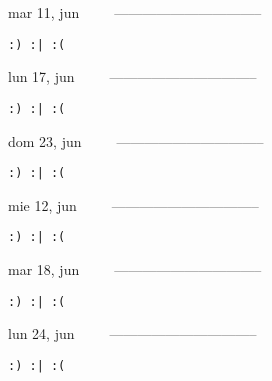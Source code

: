 \documentclass[letterpaper,10pt]{article}
\begin{document}
\begin{multicols}{3}
{mar 11, jun\ \ \ \ \ --------------------------------}
\begin{flushright}\begin{small}\texttt{:) :| :(}\end{small}\end{flushright}
\vfill
{lun 17, jun\ \ \ \ \ --------------------------------}
\begin{flushright}\begin{small}\texttt{:) :| :(}\end{small}\end{flushright}\par
\vfill
{dom 23, jun\ \ \ \ \ --------------------------------}
\begin{flushright}\begin{small}\texttt{:) :| :(}\end{small}\end{flushright}\par
\vfill
\end{multicols}
\vspace{1.05cm}

\begin{multicols}{3}
{mie 12, jun\ \ \ \ \ --------------------------------}
\begin{flushright}\begin{small}\texttt{:) :| :(}\end{small}\end{flushright}
\vfill
{mar 18, jun\ \ \ \ \ --------------------------------}
\begin{flushright}\begin{small}\texttt{:) :| :(}\end{small}\end{flushright}\par
\vfill
{lun 24, jun\ \ \ \ \ --------------------------------}
\begin{flushright}\begin{small}\texttt{:) :| :(}\end{small}\end{flushright}\par
\vfill
\end{multicols}
\vspace{1.05cm}
\end{document}
